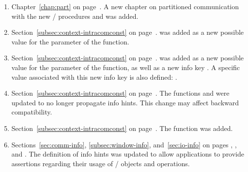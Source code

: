 \begin{enumerate}
\item
  Chapter~\ref{chap:part} on page~\pageref{chap:part}.
  \newline
  A new chapter on partitioned communication 
  with the new \MPI/ procedures 
%
%
%
%
%
%
  and 
  was added.

\item
Section~\ref{subsec:context-intracomconst} on page~\pageref{subsec:context-intracomconst}.
\newline
{} was added as a new possible value for the 
  parameter of the  function.

\item
  Section~\ref{subsec:context-intracomconst} on page~\pageref{subsec:context-intracomconst}.
  \newline
   was added as a new possible value for the 
  parameter of the  function, as well as a new info key
  . A specific value associated with this new info key is also defined:
  .

\item
Section~\ref{subsec:context-intracomconst} on page~\pageref{subsec:context-intracomconst}.
\newline
The functions  and  were
updated to no longer propagate info hints.
\newline This change may affect backward compatibility.

\item
Section~\ref{subsec:context-intracomconst} on page~\pageref{subsec:context-intracomconst}.
\newline
The
 function was added.

\item
Sections~\ref{sec:comm-info}, \ref{subsec:window-info}, and~\ref{sec:io-info} on pages
\pageref{sec:comm-info}, \pageref{subsec:window-info}, and \pageref{sec:io-info}.
\newline
The definition of info hints was updated to allow applications to provide
assertions regarding their usage of \MPI/ objects and operations.


\end{enumerate}
